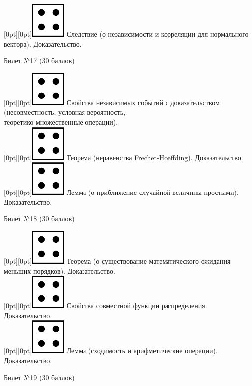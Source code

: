 \documentclass[10pt]{article}
\begin{document}
\raisebox{-1pt}[0pt][0pt]{\includegraphics[width=0.02\linewidth]{4.png}} Следствие (о независимости и корреляции для нормального вектора). Доказательство. \\
\begin{center} {\Large Билет №17 (30 баллов)} \end{center}
\raisebox{-1pt}[0pt][0pt]{\includegraphics[width=0.02\linewidth]{4.png}} Свойства независимых событий с доказательством (несовместность, условная вероятность, \\ теоретико-множественные операции). \\
\raisebox{-1pt}[0pt][0pt]{\includegraphics[width=0.02\linewidth]{4.png}} Теорема (неравенства Frechet-Hoeffding). Доказательство. \\
\raisebox{-1pt}[0pt][0pt]{\includegraphics[width=0.02\linewidth]{4.png}} Лемма (о приближение случайной величины простыми). Доказательство. \\
\begin{center} {\Large Билет №18 (30 баллов)} \end{center}
\raisebox{-1pt}[0pt][0pt]{\includegraphics[width=0.02\linewidth]{4.png}} Теорема (о существование математического ожидания меньших порядков). Доказательство. \\
\raisebox{-1pt}[0pt][0pt]{\includegraphics[width=0.02\linewidth]{4.png}} Свойства совместной функции распределения. Доказательство. \\
\raisebox{-1pt}[0pt][0pt]{\includegraphics[width=0.02\linewidth]{4.png}} Лемма (сходимость и арифметические операции). Доказательство. \\
\begin{center} {\Large Билет №19 (30 баллов)} \end{center}
\end{document}
